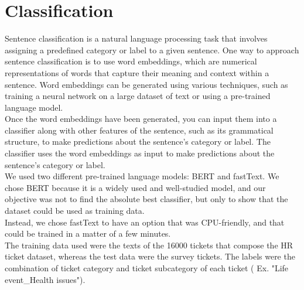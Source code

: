 \clearpage
\section{Classification}
Sentence classification is a natural language processing task that involves assigning a predefined category or label to a given sentence. One way to approach sentence classification is to use word embeddings, which are numerical representations of words that capture their meaning and context within a sentence. Word embeddings can be generated using various techniques, such as training a neural network on a large dataset of text or using a pre-trained language model. \\
Once the word embeddings have been generated, you can input them into a classifier along with other features of the sentence, such as its grammatical structure, to make predictions about the sentence's category or label. The classifier uses the word embeddings as input to make predictions about the sentence's category or label. \\
We used two different pre-trained language models: BERT and fastText. We chose BERT because it is a widely used and well-studied model, and our objective was not to find the absolute best classifier, but only to show that the dataset could be used as training data. \\
Instead, we chose fastText to have an option that was CPU-friendly, and that could be trained in a matter of a few minutes. \\
The training data used were the texts of the 16000 tickets that compose the HR ticket dataset, whereas the test data were the survey tickets. The labels were the combination of ticket category and ticket subcategory of each ticket ( Ex. "Life event\_Health issues").


